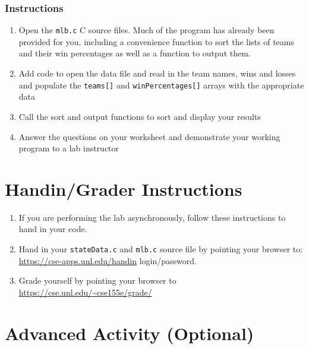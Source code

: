 \documentclass[12pt]{scrartcl}
\begin{document}
\subsubsection*{Instructions}

\begin{enumerate}
  \item Open the \texttt{mlb.c} C source files.  Much of the program 
  	has already been provided for you, including a convenience function to 
	sort the lists of teams and their win percentages as well as a function 
	to output them.
  \item Add code to open the data file and read in the team names, wins and 
	losses and populate the \texttt{teams[]} and \texttt{winPercentages[]} 
	arrays with the appropriate data
  \item Call the sort and output functions to sort and display your results
  \item Answer the questions on your worksheet and demonstrate your working 
  	program to a lab instructor
\end{enumerate}



\section{Handin/Grader Instructions}

\begin{enumerate}
  \item If you are performing the lab asynchronously, follow these instructions to hand in your code.
  \item Hand in your \texttt{stateData.c} and \texttt{mlb.c} source file by pointing your browser to:
  	\url{https://cse-apps.unl.edu/handin}
	login/password.
  \item Grade yourself by pointing your browser to
  	\url{https://cse.unl.edu/~cse155e/grade/}
\end{enumerate}

\section{Advanced Activity (Optional)}
\end{document}
